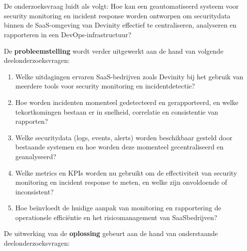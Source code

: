 \section{}%
\label{sec:onderzoeksvraag}

De onderzoeksvraag luidt als volgt: Hoe kan een geautomatiseerd systeem voor security monitoring en incident response worden ontworpen om securitydata binnen de SaaS-omgeving van Devinity effectief te centraliseren, analyseren en rapporteren in een DevOps-infrastructuur?

De \textbf{probleemstelling} wordt verder uitgewerkt aan de hand van volgende deelonderzoeksvragen:

\begin{enumerate}
    \item Welke uitdagingen ervaren SaaS-bedrijven zoals Devinity bij het gebruik van meerdere tools voor security monitoring en incidentdetectie?
    \item Hoe worden incidenten momenteel gedetecteerd en gerapporteerd, en welke tekortkomingen bestaan er in snelheid, correlatie en consistentie van rapporten?
    \item Welke securitydata (logs, events, alerts) worden beschikbaar gesteld door bestaande systemen en hoe worden deze momenteel gecentraliseerd en geanalyseerd?
    \item Welke metrics en KPIs worden nu gebruikt om de effectiviteit van security monitoring en incident response te meten, en welke zijn onvoldoende of inconsistent?
    \item Hoe beïnvloedt de huidige aanpak van monitoring en rapportering de operationele efficiëntie en het risicomanagement van SaaSbedrijven?
\end{enumerate}

De uitwerking van de \textbf{oplossing} gebeurt aan de hand van onderstaande deelonderzoeksvragen:

